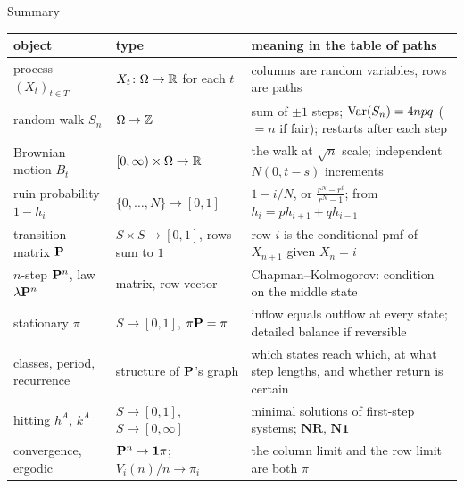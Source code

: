 \begin{frame}{Summary}
  \label{fr:summary}
  \footnotesize
  \renewcommand{\arraystretch}{1.15}
  \begin{tabular}{@{}>{\raggedright\arraybackslash}p{3.2cm}>{\raggedright\arraybackslash}p{3.7cm}>{\raggedright\arraybackslash}p{6.1cm}@{}}
    \toprule
    object & type & meaning in the table of paths \\
    \midrule
    process $(X_t)_{t\in T}$ & $X_t\colon\Omega\to\mathbb{R}$ for each $t$ & columns are random variables, rows are paths \\
    random walk $S_n$ & $\Omega\to\mathbb{Z}$ & sum of $\pm1$ steps; $\operatorname{Var}(S_n)=4npq$ ($=n$ if fair); restarts after each step \\
    Brownian motion $B_t$ & $[0,\infty)\times\Omega\to\mathbb{R}$ & the walk at $\sqrt n$ scale; independent $N(0,t-s)$ increments \\
    ruin probability $1-h_i$ & $\{0,\dots,N\}\to[0,1]$ & $1-i/N$, or $\frac{r^N-r^i}{r^N-1}$; from $h_i=ph_{i+1}+qh_{i-1}$ \\
    transition matrix $\mathbf{P}$ & $S\times S\to[0,1]$, rows sum to $1$ & row $i$ is the conditional pmf of $X_{n+1}$ given $X_n=i$ \\
    $n$-step $\mathbf{P}^n$, law $\lambda\mathbf{P}^n$ & matrix, row vector & Chapman--Kolmogorov: condition on the middle state \\
    stationary $\pi$ & $S\to[0,1]$, $\pi\mathbf{P}=\pi$ & inflow equals outflow at every state; detailed balance if reversible \\
    classes, period, recurrence & structure of $\mathbf{P}$'s graph & which states reach which, at what step lengths, and whether return is certain \\
    hitting $h^A$, $k^A$ & $S\to[0,1]$, $S\to[0,\infty]$ & minimal solutions of first-step systems; $\mathbf N\mathbf R$, $\mathbf N\mathbf 1$ \\
    convergence, ergodic & $\mathbf{P}^n\to\mathbf 1\pi$; $V_i(n)/n\to\pi_i$ & the column limit and the row limit are both $\pi$ \\
    \bottomrule
  \end{tabular}
  \medskip
\end{frame}
